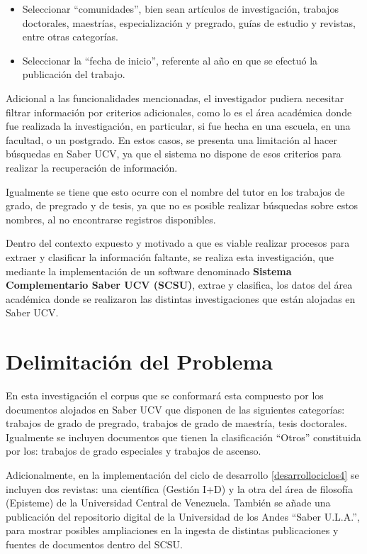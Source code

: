 \documentclass[
  12pt,
  openany]{book}
\begin{document}
\begin{itemize}
\item
  Seleccionar ``comunidades'', bien sean artículos de investigación, trabajos doctorales, maestrías, especialización y pregrado, guías de estudio y revistas, entre otras categorías.
\item
  Seleccionar la ``fecha de inicio'', referente al año en que se efectuó la publicación del trabajo.
\end{itemize}

Adicional a las funcionalidades mencionadas, el investigador pudiera necesitar filtrar información por criterios adicionales, como lo es el área académica donde fue realizada la investigación, en particular, si fue hecha en una escuela, en una facultad, o un postgrado. En estos casos, se presenta una limitación al hacer búsquedas en Saber UCV, ya que el sistema no dispone de esos criterios para realizar la recuperación de información.

Igualmente se tiene que esto ocurre con el nombre del tutor en los trabajos de grado, de pregrado y de tesis, ya que no es posible realizar búsquedas sobre estos nombres, al no encontrarse registros disponibles.

Dentro del contexto expuesto y motivado a que es viable realizar procesos para extraer y clasificar la información faltante, se realiza esta investigación, que mediante la implementación de un software denominado \textbf{Sistema Complementario Saber UCV (SCSU)}, extrae y clasifica, los datos del área académica donde se realizaron las distintas investigaciones que están alojadas en Saber UCV.

\hypertarget{delimitacion}{%
\section{Delimitación del Problema}\label{delimitacion}}

En esta investigación el corpus que se conformará esta compuesto por los documentos alojados en Saber UCV que disponen de las siguientes categorías: trabajos de grado de pregrado, trabajos de grado de maestría, tesis doctorales. Igualmente se incluyen documentos que tienen la clasificación ``Otros'' constituida por los: trabajos de grado especiales y trabajos de ascenso.

Adicionalmente, en la implementación del ciclo de desarrollo \ref{desarrollociclos4} se incluyen dos revistas: una científica (Gestión I+D) y la otra del área de filosofía (Episteme) de la Universidad Central de Venezuela. También se añade una publicación del repositorio digital de la Universidad de los Andes ``Saber U.L.A.'', para mostrar posibles ampliaciones en la ingesta de distintas publicaciones y fuentes de documentos dentro del SCSU.
\end{document}
